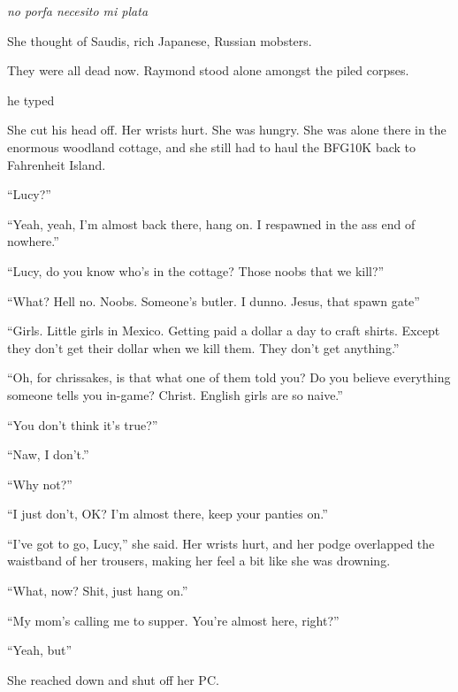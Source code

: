 \emph{no porfa necesito mi plata}

She thought of Saudis, rich Japanese, Russian mobsters.

They were all dead now. Raymond stood alone amongst the piled
corpses.

he typed

She cut his head off. Her wrists hurt. She was hungry. She was
alone there in the enormous woodland cottage, and she still had to
haul the BFG10K back to Fahrenheit Island.

“Lucy?”

“Yeah, yeah, I’m almost back there, hang on. I respawned in the ass
end of nowhere.”

“Lucy, do you know who’s in the cottage? Those noobs that we
kill?”

“What? Hell no. Noobs. Someone’s butler. I dunno. Jesus, that spawn
gate\dash{}”

“Girls. Little girls in Mexico. Getting paid a dollar a day to
craft shirts. Except they don’t get their dollar when we kill them.
They don’t get anything.”

“Oh, for chrissakes, is that what one of them told you? Do you
believe everything someone tells you in-game? Christ. English girls
are so naive.”

“You don’t think it’s true?”

“Naw, I don’t.”

“Why not?”

“I just don’t, OK? I’m almost there, keep your panties on.”

“I’ve got to go, Lucy,” she said. Her wrists hurt, and her podge
overlapped the waistband of her trousers, making her feel a bit
like she was drowning.

“What, now? Shit, just hang on.”

“My mom’s calling me to supper. You’re almost here, right?”

“Yeah, but\dash{}”

She reached down and shut off her PC.

\tb

